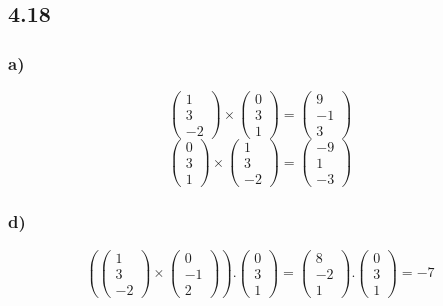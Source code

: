 \documentclass[11pt]{article}
\begin{document}
\subsection*{4.18}
\subsubsection*{a)}
\[
\begin{pmatrix}
1\\3\\-2
\end{pmatrix}
\times
\begin{pmatrix}
0\\3\\1
\end{pmatrix}
=
\begin{pmatrix}
9\\-1\\3
\end{pmatrix}
\]
\[
\begin{pmatrix}
0\\3\\1
\end{pmatrix}
\times
\begin{pmatrix}
1\\3\\-2
\end{pmatrix}
=
\begin{pmatrix}
-9\\1\\-3
\end{pmatrix}
\]

\subsubsection*{d)}
\[
\left(
\begin{pmatrix}
1\\3\\-2
\end{pmatrix}
\times
\begin{pmatrix}
0\\-1\\2
\end{pmatrix}
\right)
.
\begin{pmatrix}
0\\3\\1
\end{pmatrix}
=
\begin{pmatrix}
8\\-2\\1
\end{pmatrix}
.
\begin{pmatrix}
0\\3\\1
\end{pmatrix}
=-7
\]
\end{document}
